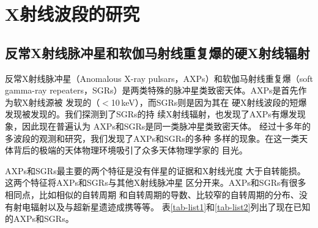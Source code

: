 
\def\qui {1E 1547-54}
\def\uu {4U~0142$+$61}
\def\oo {1E~1048$-$59}
\def\kes {1E~1841$-$045}
\def\axj {AX~J1845$-$02}
\def\rxs {1RXS~J1708$-$40}
\def\eee {1E~2259$+$586}
\def\xte {XTE~J1810$-$197}
\def\cxo {CXOU~J1647$-$45}
\def\smc {CXOU~J0100-72}
\def\zerosei {SGR~1806$-$20}
\def\zerozero {SGR~1900$+$14}
\def\sedici {SGR~1627$-$41}
\def\lmc {SGR~0526$-$66}
\def\quil {1E 1547.0-5408}
\def\uul {4U~0142$+$61}
\def\ool {1E~1048$-$586}
\def\kesl {1E~1841$-$045}
\def\axjl {AX~J1844.8$-$0256}
\def\rxsl {1RXS~J170849$-$400910}
\def\eel {1E~2259$+$586}
\def\xtel {XTE~J1810$-$197}
\def\cxol {CXOU~J164710.2$-$455216}
\def\smcl {CXOU~J010043.1-721134}

\chapter{X射线波段的研究}

\section{反常X射线脉冲星和软伽马射线重复爆的硬X射线辐射}

反常X射线脉冲星（Anomalous X-ray pulsars，AXPs）和软伽马射线重复爆（soft gamma-ray 
repeaters，SGRs）是两类特殊的脉冲星类致密天体。AXPs是首先作为软X射线源被
发现的（$<$10\,keV）\supercite{fg81,scs86,ims94}，而SGRs则是因为其在
硬X射线波段的短爆发现被发现的\supercite{mgg+79,mgi+79}。我们探测到了SGRs的持
续X射线辐射，也发现了AXPs有爆发现象，因此现在普遍认为
AXPs和SGRs是同一类脉冲星类致密天体\supercite{m08}。
%
经过十多年的多波段的观测和研究，我们发现了AXPs和SGRs的多种
多样的现象。在这一类天体背后的极端的天体物理环境吸引了众多天体物理学家的
目光\supercite{m08}。

AXPs和SGRs最主要的两个特征是没有伴星的证据和X射线光度
大于自转能损。这两个特征将AXPs和SGRs与其他X射线脉冲星
区分开来。AXPs和SGRs有很多相同点，比如相似的自转周期
和自转周期的导数、比较窄的自转周期的分布、没有射电辐射以及与超新星遗迹成携等等。
表\ref{tab-list1}和\ref{tab-list2}列出了现在已知的AXPs和SGRs\supercite{m08}。

